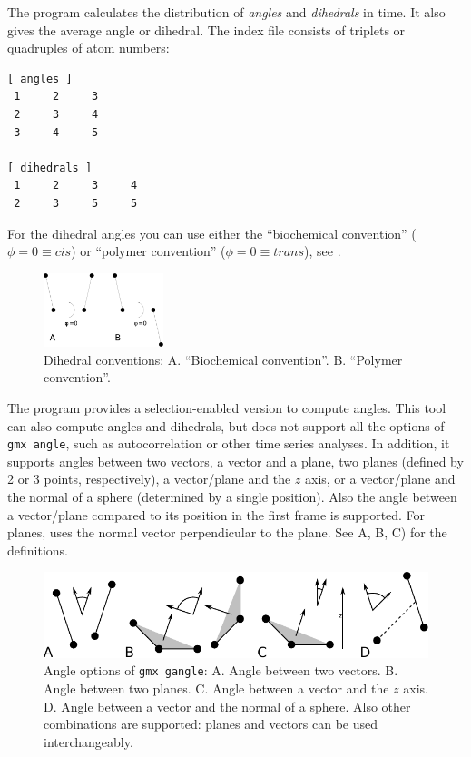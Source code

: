 The program {\tt {}} calculates the distribution of {\em angles} and
{\em dihedrals} in time. It also gives the average angle or dihedral. 
The index file consists of triplets or quadruples of atom numbers:

\begin{verbatim}
[ angles ]
 1     2     3
 2     3     4
 3     4     5

[ dihedrals ]
 1     2     3     4
 2     3     5     5
\end{verbatim}

For the dihedral angles you can use either the ``biochemical convention'' 
($\phi = 0 \equiv cis$) or ``polymer convention'' ($\phi = 0 \equiv trans$), 
see .

\begin{figure}
\centerline{
{\includegraphics[width=3.5cm,angle=270]{plots/dih-def}}}
\caption[Dihedral conventions.]{Dihedral conventions: A. ``Biochemical
convention''. B. ``Polymer convention''.}
\label{fig:dih_def}
\end{figure}

The program {\tt {}} provides a selection-enabled
version to compute angles.  This tool can also compute angles and
dihedrals, but does not support all the options of {\tt gmx angle}, such
as autocorrelation or other time series analyses.
In addition, it supports angles between two vectors, a vector and a
plane, two planes (defined by 2 or 3 points, respectively), a
vector/plane and the $z$ axis, or a vector/plane and the normal of a
sphere (determined by a single position).
Also the angle between a vector/plane compared to its position in the
first frame is supported.
For planes, {\tt {}} uses the normal vector
perpendicular to the plane.
See A, B, C) for the definitions.

\begin{figure}
\centerline{
{\includegraphics{plots/sgangle}}}
\caption[Angle options of {\tt gmx gangle}.]{Angle options of {\tt gmx gangle}:
A. Angle between two vectors.
B. Angle between two planes.
C. Angle between a vector and the $z$ axis.
D. Angle between a vector and the normal of a sphere.
Also other combinations are supported: planes and vectors can be used
interchangeably.}
\label{fig:sgangle}
\end{figure}


